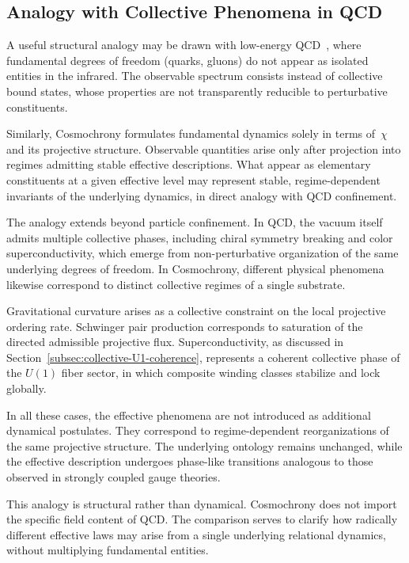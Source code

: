 \subsection{Analogy with Collective Phenomena in QCD}
  \label{subsec:analogy-with-collective-phenomena-in-qcd}

  A useful structural analogy may be drawn with low-energy
  QCD~\cite{Shifman2007QCDVacuum}, where fundamental degrees of freedom
  (quarks, gluons) do not appear as isolated entities in the infrared.
  The observable spectrum consists instead of collective bound states,
  whose properties are not transparently reducible to perturbative
  constituents.

  Similarly, Cosmochrony formulates fundamental dynamics solely in terms
  of~$\chi$ and its projective structure.
  Observable quantities arise only after projection into regimes
  admitting stable effective descriptions.
  What appear as elementary constituents at a given effective level may
  represent stable, regime-dependent invariants of the underlying
  dynamics, in direct analogy with QCD confinement.

  The analogy extends beyond particle confinement.
  In QCD, the vacuum itself admits multiple collective phases,
  including chiral symmetry breaking and color superconductivity,
  which emerge from non-perturbative organization of the same
  underlying degrees of freedom.
  In Cosmochrony, different physical phenomena likewise correspond
  to distinct collective regimes of a single substrate.

  Gravitational curvature arises as a collective constraint on the local
  projective ordering rate.
  Schwinger pair production corresponds to saturation of the directed
  admissible projective flux.
  Superconductivity, as discussed in Section~\ref{subsec:collective-U1-coherence},
  represents a coherent collective phase of the $U(1)$ fiber sector,
  in which composite winding classes stabilize and lock globally.

  In all these cases, the effective phenomena are not introduced as additional dynamical postulates.
  They correspond to regime-dependent reorganizations of the same projective structure.
  The underlying ontology remains unchanged, while the effective
  description undergoes phase-like transitions analogous to those
  observed in strongly coupled gauge theories.

  This analogy is structural rather than dynamical.
  Cosmochrony does not import the specific field content of QCD.
  The comparison serves to clarify how radically different effective
  laws may arise from a single underlying relational dynamics,
  without multiplying fundamental entities.
